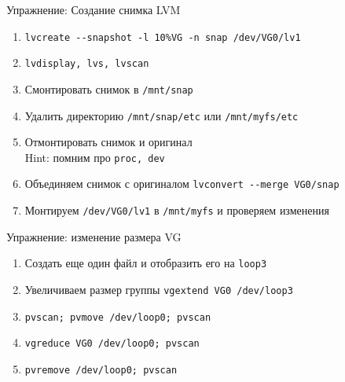 \begin{frame}{Упражнение: Создание снимка LVM}
  \begin{enumerate}
    \item  {\tt lvcreate -\phantom{}-snapshot -l 10\%VG -n snap /dev/VG0/lv1}
    \item  {\tt lvdisplay, lvs, lvscan}
	\item Смонтировать снимок в {\tt /mnt/snap}
		\pause
	\item Удалить директорию {\tt /mnt/snap/etc} или {\tt /mnt/myfs/etc}
	\item Отмонтировать снимок и оригинал\\
		Hint: помним про {\tt proc, dev}
		\pause
	\item Объединяем снимок с оригиналом {\tt lvconvert -\phantom{}-merge VG0/snap}
	\item Монтируем {\tt /dev/VG0/lv1} в {\tt /mnt/myfs} и проверяем изменения
  \end{enumerate}
\end{frame}

\begin{frame}{Упражнение: изменение размера VG}
  \begin{enumerate}
	\item Создать еще один файл и отобразить его на {\tt loop3}
	\item Увеличиваем размер группы {\tt vgextend VG0 /dev/loop3}
		\pause
    \item  {\tt pvscan; pvmove /dev/loop0; pvscan}
    \item  {\tt vgreduce VG0 /dev/loop0; pvscan}
    \item  {\tt pvremove /dev/loop0; pvscan}
  \end{enumerate}
\end{frame}


